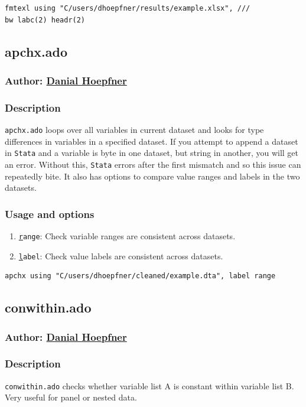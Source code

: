 {\begin{lstlisting}
fmtexl using "C/users/dhoepfner/results/example.xlsx", ///
bw labc(2) headr(2)
\end{lstlisting}

\subsection{apchx.ado}
\subsubsection{Author: \href{mailto:dhoepfner@gibsonconsult.com}{Danial Hoepfner}}
\subsubsection{Description}
\texttt{apchx.ado} loops over all variables in current dataset and looks for type differences in variables in a specified dataset. If you attempt to append a dataset in \texttt{Stata} and a variable is byte in one dataset, but string in another, you will get an error. Without this, \texttt{Stata} errors after the first mismatch and so this issue can repeatedly bite. It also has options to compare value ranges and labels in the two datasets.
\subsubsection{Usage and options}
\begin{enumerate}
\item \texttt{\underline{r}ange}: Check variable ranges are consistent across datasets.
\item \texttt{\underline{l}abel}: Check value labels are consistent across datasets.
\end{enumerate}

\begin{lstlisting}
apchx using "C/users/dhoepfner/cleaned/example.dta", label range
\end{lstlisting}

\subsection{conwithin.ado}
\subsubsection{Author: \href{mailto:dhoepfner@gibsonconsult.com}{Danial Hoepfner}}
\subsubsection{Description}
\texttt{conwithin.ado} checks whether variable list A is constant within variable list B. Very useful for panel or nested data.
}
